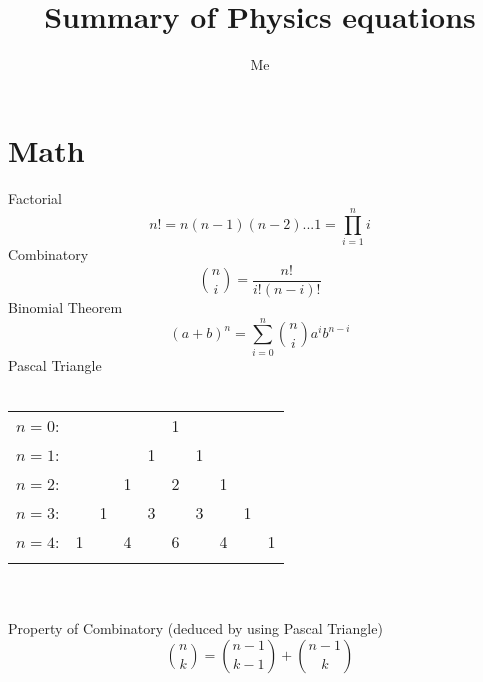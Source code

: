 \documentclass{article}
\title{Summary of Physics equations}
\author{Me}
\date{}
\begin{document}
\maketitle

\section{Math}
Factorial
\begin{equation}
  n! = n(n-1)(n-2)...1 = \prod_{i=1}^{n}i
\end{equation}
Combinatory
\begin{equation}
  \binom{n}{i} = \frac{n!}{i!(n-i)!}
\end{equation}
Binomial Theorem
\begin{equation}
  (a+b)^n = \sum_{i=0}^n\binom{n}{i}a^ib^{n-i}
\end{equation}
Pascal Triangle\\\\
\begin{tabular}{rccccccccc}
$n=0$:&    &    &    &    &  1\\\noalign{\smallskip\smallskip}
$n=1$:&    &    &    &  1 &    &  1\\\noalign{\smallskip\smallskip}
$n=2$:&    &    &  1 &    &  2 &    &  1\\\noalign{\smallskip\smallskip}
$n=3$:&    &  1 &    &  3 &    &  3 &    &  1\\\noalign{\smallskip\smallskip}
$n=4$:&  1 &    &  4 &    &  6 &    &  4 &    &  1\\\noalign{\smallskip\smallskip}
\end{tabular}
\\\\
Property of Combinatory (deduced by using Pascal Triangle)
\begin{equation}
  \binom{n}{k} = \binom{n-1}{k-1} + \binom{n-1}{k}
\end{equation}
\end{document}
